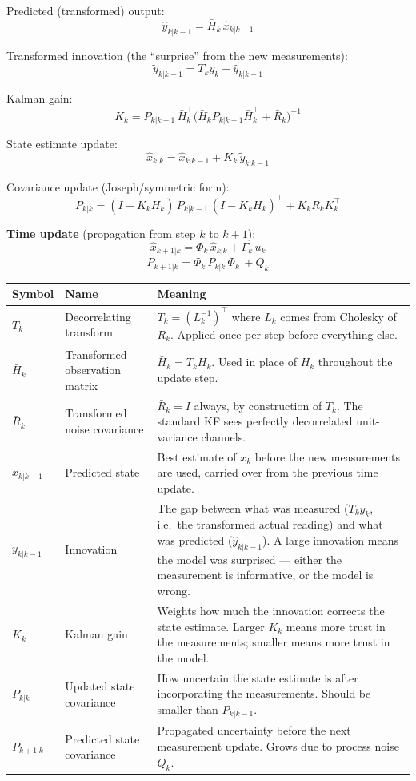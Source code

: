 \documentclass[12pt, a4paper]{article}
\begin{document}
Predicted (transformed) output:
\[
  \hat{y}_{k|k-1} = \bar{H}_k\, \hat{x}_{k|k-1}
\]

Transformed innovation (the ``surprise'' from the new measurements):
\[
  \tilde{y}_{k|k-1} = T_k y_k - \hat{y}_{k|k-1}
\]

Kalman gain:
\[
  K_k = P_{k|k-1}\, \bar{H}_k^\top
        \bigl(\bar{H}_k P_{k|k-1} \bar{H}_k^\top + \bar{R}_k\bigr)^{-1}
\]

State estimate update:
\[
  \hat{x}_{k|k} = \hat{x}_{k|k-1} + K_k\, \tilde{y}_{k|k-1}
\]

Covariance update (Joseph/symmetric form):
\[
  P_{k|k} = (I - K_k \bar{H}_k)\, P_{k|k-1}\, (I - K_k \bar{H}_k)^\top
            + K_k \bar{R}_k K_k^\top
\]

\textbf{Time update} (propagation from step $k$ to $k{+}1$):
\[
  \hat{x}_{k+1|k} = \Phi_k\, \hat{x}_{k|k} + \Gamma_k\, u_k
\]
\[
  P_{k+1|k} = \Phi_k\, P_{k|k}\, \Phi_k^\top + Q_k
\]

\begin{center}
\begin{tabular}{@{} l p{3.5cm} p{7.0cm} @{}}
  \toprule
  Symbol & Name & Meaning \\
  \midrule
  $T_k$ & Decorrelating transform &
    $T_k = (L_k^{-1})^\top$ where $L_k$ comes from Cholesky of $R_k$.
    Applied once per step before everything else. \\[3pt]
  $\bar{H}_k$ & Transformed observation matrix &
    $\bar{H}_k = T_k H_k$.
    Used in place of $H_k$ throughout the update step. \\[3pt]
  $\bar{R}_k$ & Transformed noise covariance &
    $\bar{R}_k = I$ always, by construction of $T_k$.
    The standard KF sees perfectly decorrelated unit-variance channels. \\[3pt]
  $\hat{x}_{k|k-1}$ & Predicted state &
    Best estimate of $x_k$ before the new measurements are used,
    carried over from the previous time update. \\[3pt]
  $\tilde{y}_{k|k-1}$ & Innovation &
    The gap between what was measured ($T_k y_k$, i.e.\ the transformed
    actual reading) and what was predicted ($\hat{y}_{k|k-1}$).
    A large innovation means the model was surprised ---
    either the measurement is informative, or the model is wrong. \\[3pt]
  $K_k$ & Kalman gain &
    Weights how much the innovation corrects the state estimate.
    Larger $K_k$ means more trust in the measurements;
    smaller means more trust in the model. \\[3pt]
  $P_{k|k}$ & Updated state covariance &
    How uncertain the state estimate is after incorporating the
    measurements.  Should be smaller than $P_{k|k-1}$. \\[3pt]
  $P_{k+1|k}$ & Predicted state covariance &
    Propagated uncertainty before the next measurement update.
    Grows due to process noise $Q_k$. \\
  \bottomrule
\end{tabular}
\end{center}
\end{document}
